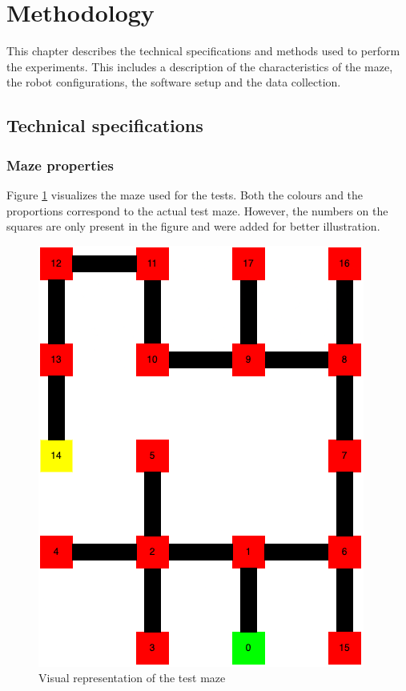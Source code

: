 \section{Methodology} \label{sec:methodology}
This chapter describes the technical specifications and methods used to perform the experiments. This includes a description of the characteristics of the maze, the robot configurations, the software setup and the data collection.

\subsection{Technical specifications}
\subsubsection{Maze properties} \label{sec:maze_properties}
Figure \ref{fig:maze} visualizes the maze used for the tests. Both the colours and the proportions correspond to the actual test maze. However, the numbers on the squares are only present in the figure and were added for better illustration.

\begin{figure}[htb!]
    \centering
    \includegraphics[scale=0.6]{resources/maze.png}
    \caption{Visual representation of the test maze}
    \label{fig:maze}
\end{figure}

